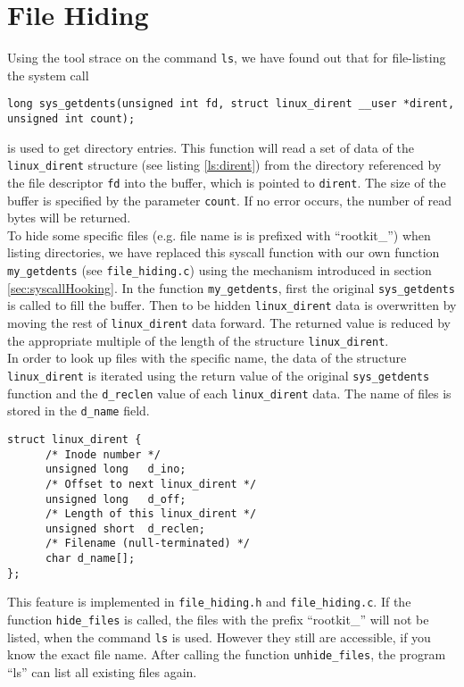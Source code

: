 \section{File Hiding}
Using the tool strace on the command \texttt{ls}, we have found out that for file-listing the system call 
\lstset{escapechar=,style=customc}
\begin{lstlisting}
long sys_getdents(unsigned int fd, struct linux_dirent __user *dirent, unsigned int count);
\end{lstlisting}
is used to get directory entries. This function will read a set of data of the \verb+linux_dirent+ structure (see listing \ref{ls:dirent}) from the directory referenced by the file descriptor \texttt{fd} into the buffer, which is pointed to \texttt{dirent}. The size of the buffer is specified by the parameter \texttt{count}. If no error occurs, the number of read bytes will be returned.\\
To hide some specific files (e.g. file name is is prefixed with ``rootkit\_'') when listing directories, we have replaced this syscall function with our own function \verb+my_getdents+ (see \verb+file_hiding.c+) using the mechanism introduced in section \ref{sec:syscallHooking}. In the function \verb+my_getdents+, first the original \verb+sys_getdents+ is called to fill the buffer. Then to be hidden \verb+linux_dirent+ data is overwritten by moving the rest of \verb+linux_dirent+ data forward. The returned value is reduced by the appropriate multiple of the length of the structure \verb+linux_dirent+.\\ 
In order to look up files with the specific name, the data of the structure \verb+linux_dirent+ is iterated using the return value of the original \verb+sys_getdents+ function and the \verb+d_reclen+ value of each \verb+linux_dirent+ data. The name of files is stored in the \verb+d_name+ field. 
\lstset{escapechar=,style=customc}
\begin{lstlisting}[captionpos=b, caption={The \texttt{linux\_dirent} structure defined in \texttt{/fs/readdir.c}}, label={ls:dirent}]
struct linux_dirent {
      /* Inode number */
      unsigned long   d_ino;
      /* Offset to next linux_dirent */
      unsigned long   d_off;
      /* Length of this linux_dirent */
      unsigned short  d_reclen; 
      /* Filename (null-terminated) */
      char d_name[];
};
\end{lstlisting}
This feature is implemented in \verb+file_hiding.h+ and \verb+file_hiding.c+. If the function \verb+hide_files+ is called, the files with the prefix ``rootkit\_'' will not be listed, when the command \texttt{ls} is used. However they still are accessible, if you know the exact file name. After calling the function \verb+unhide_files+, the program ``ls'' can list all existing files again. 
